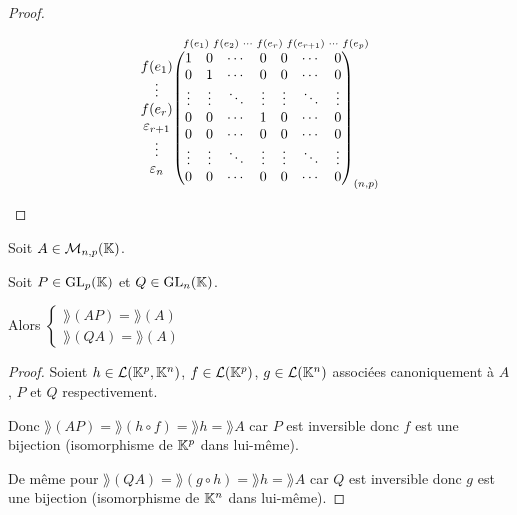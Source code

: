 \documentclass[12pt, a4paper]{report}
\begin{document}
\begin{proof}
\begin{itemize}
        $$\begin{matrix}
            f(e_1) \\
            \vdots \\
            f(e_r) \\
            \varepsilon_{r+1} \\
            \vdots \\
            \varepsilon_n
        \end{matrix}
        \overset{\scriptsize{f(e_1) ~ f(e_2) ~ \cdots ~ f(e_r) ~ f(e_{r+1}) ~ \cdots ~ f(e_p)}}{\left(\begin{matrix}
            1 & 0 & \cdots & 0 & 0 & \cdots & 0 \\
            0 & 1 & \cdots & 0 & 0 & \cdots & 0 \\
            \vdots & \vdots & \ddots & \vdots & \vdots & \ddots & \vdots \\
            0 & 0 & \cdots & 1 & 0 & \cdots & 0 \\
            0 & 0 & \cdots & 0 & 0 & \cdots & 0 \\
            \vdots & \vdots & \ddots & \vdots & \vdots & \ddots & \vdots \\
            0 & 0 & \cdots & 0 & 0 & \cdots & 0
        \end{matrix}\right)_{(n,p)}}$$
    \end{itemize}
\end{proof}

\begin{property}
    Soit $A \in \mathcal M_{n,p}(\mathbb{K})$.
    
    Soit $P \in \mathrm{GL}_p(\mathbb{K})$ et $Q \in \mathrm{GL}_n(\mathbb{K})$.

    Alors $\begin{cases} \rang(AP) = \rang(A) \\ \rang(QA) = \rang(A) \end{cases}$
\end{property}

\begin{proof}
    Soient $h \in \mathcal L(\mathbb{K}^p, \mathbb{K}^n)$, $f \in \mathcal L(\mathbb{K}^p)$, $g \in \mathcal L(\mathbb{K}^n)$ associées canoniquement à $A$, $P$ et $Q$ respectivement.

    Donc $\rang(AP) = \rang(h \circ f) = \rang h = \rang A$ car $P$ est inversible donc $f$ est une bijection (isomorphisme de $\mathbb{K}^p$ dans lui-même).

    De même pour $\rang(QA) = \rang(g \circ h) = \rang h = \rang A$ car $Q$ est inversible donc $g$ est une bijection (isomorphisme de $\mathbb{K}^n$ dans lui-même).
\end{proof}
\end{document}
